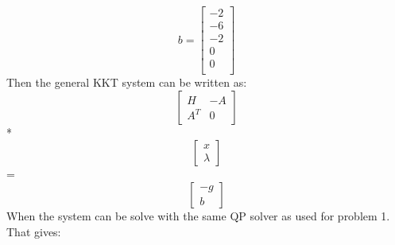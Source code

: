\[b= \begin{bmatrix}
	-2 \\-6 \\-2 \\0 \\0 \\
\end{bmatrix}\]
Then the general KKT system can be written as:
\[\begin{bmatrix}
	H & -A \\A^T & 0
\end{bmatrix}\] 
*
\[\begin{bmatrix}
	x\\ \lambda
\end{bmatrix}\] 
=
\[\begin{bmatrix}
	-g\\ b
\end{bmatrix}\]
When the system can be solve with the same QP solver as used for problem 1. That gives:

